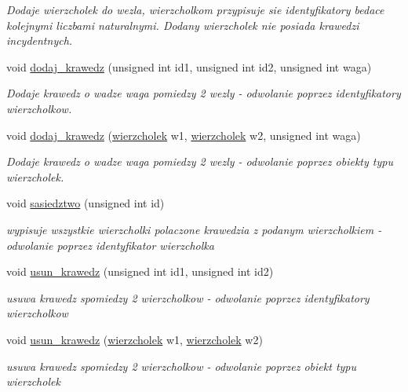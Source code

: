 \begin{DoxyCompactItemize}
\begin{DoxyCompactList}\small\item\em \-Dodaje wierzcholek do wezla, wierzcholkom przypisuje sie identyfikatory bedace kolejnymi liczbami naturalnymi. \-Dodany wierzcholek nie posiada krawedzi incydentnych. \end{DoxyCompactList}\item 
void \hyperlink{classgraf_af263156c2af2d8d2ec0d7ff0ee3dd9af}{dodaj\-\_\-krawedz} (unsigned int id1, unsigned int id2, unsigned int waga)
\begin{DoxyCompactList}\small\item\em \-Dodaje krawedz o wadze waga pomiedzy 2 wezly -\/ odwolanie poprzez identyfikatory wierzcholkow. \end{DoxyCompactList}\item 
void \hyperlink{classgraf_a8442b7d095a21024666b12c3e3f4184b}{dodaj\-\_\-krawedz} (\hyperlink{classwierzcholek}{wierzcholek} w1, \hyperlink{classwierzcholek}{wierzcholek} w2, unsigned int waga)
\begin{DoxyCompactList}\small\item\em \-Dodaje krawedz o wadze waga pomiedzy 2 wezly -\/ odwolanie poprzez obiekty typu wierzcholek. \end{DoxyCompactList}\item 
void \hyperlink{classgraf_a6a3ee98f332805da9c65749bacad27db}{sasiedztwo} (unsigned int id)
\begin{DoxyCompactList}\small\item\em wypisuje wszystkie wierzcholki polaczone krawedzia z podanym wierzcholkiem -\/ odwolanie poprzez identyfikator wierzcholka \end{DoxyCompactList}\item 
void \hyperlink{classgraf_aede977ec0f8660ad4a8c09449535cb74}{usun\-\_\-krawedz} (unsigned int id1, unsigned int id2)
\begin{DoxyCompactList}\small\item\em usuwa krawedz spomiedzy 2 wierzcholkow -\/ odwolanie poprzez identyfikatory wierzcholkow \end{DoxyCompactList}\item 
void \hyperlink{classgraf_a17cff8e4bdff073674dc95927221d128}{usun\-\_\-krawedz} (\hyperlink{classwierzcholek}{wierzcholek} w1, \hyperlink{classwierzcholek}{wierzcholek} w2)
\begin{DoxyCompactList}\small\item\em usuwa krawedz spomiedzy 2 wierzcholkow -\/ odwolanie poprzez obiekt typu wierzcholek \end{DoxyCompactList}\item 

\end{DoxyCompactItemize}
